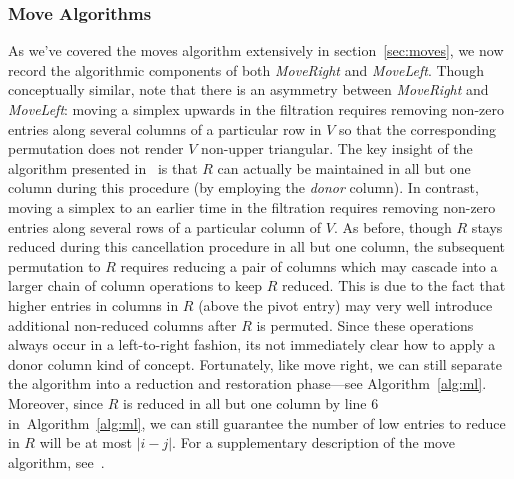 \documentclass[sn-mathphys]{sn-jnl}
\newtheorem{proposition}{Proposition}
\begin{document}
\subsubsection*{Move Algorithms}
As we've covered the moves algorithm extensively in section~\ref{sec:moves}, we now record the algorithmic components of both \emph{MoveRight} and \emph{MoveLeft}.
Though conceptually similar, note that there is an asymmetry between \emph{MoveRight} and \emph{MoveLeft}: moving a simplex upwards in the filtration requires removing non-zero entries along several columns of a particular row in $V$ so that the corresponding permutation does not render $V$ non-upper triangular. The key insight of the algorithm presented in~\cite{busaryev2010tracking} is that $R$ can actually be maintained in all but one column during this procedure (by employing the \emph{donor} column). In contrast, moving a simplex to an earlier time in the filtration requires removing non-zero entries along several rows of a particular column of $V$. As before, though $R$ stays reduced during this cancellation procedure in all but one column, the subsequent permutation to $R$ requires reducing a pair of columns which may cascade into a larger chain of column operations to keep $R$ reduced. 
This is due to the fact that higher entries in columns in $R$ (above the pivot entry) may very well introduce additional non-reduced columns after $R$ is permuted. 
Since these operations always occur in a left-to-right fashion, its not immediately clear how to apply a donor column kind of concept. Fortunately, like move right, we can still separate the algorithm into a reduction and restoration phase---see Algorithm~\ref{alg:ml}. Moreover, since $R$ is reduced in all but one column by line 6 in~Algorithm~\ref{alg:ml}, we can still guarantee the number of low entries to reduce in $R$ will be at most $\lvert i - j \rvert$. For a supplementary description of the move algorithm, see~\cite{busaryev2010tracking}.

\end{document}
